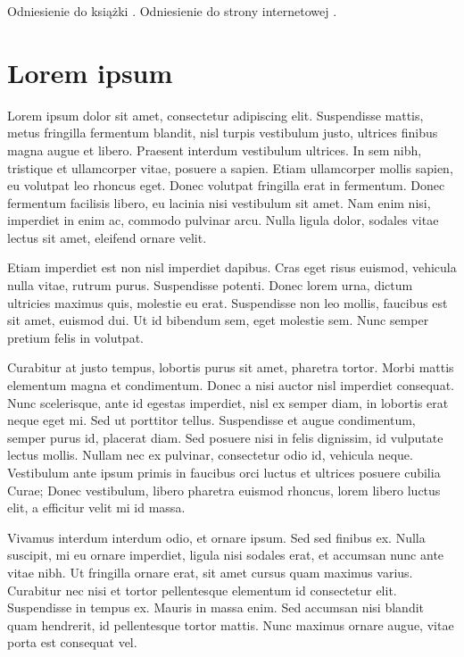 \documentclass[a4paper,12pt,polish,twoside]{extreport}
\begin{document}
Odniesienie do książki \cite{example_book}. Odniesienie do strony internetowej \cite{example_website}.

\section{Lorem ipsum}
Lorem ipsum dolor sit amet, consectetur adipiscing elit. Suspendisse mattis, metus fringilla fermentum blandit, nisl turpis vestibulum justo, ultrices finibus magna augue et libero. Praesent interdum vestibulum ultrices. In sem nibh, tristique et ullamcorper vitae, posuere a sapien. Etiam ullamcorper mollis sapien, eu volutpat leo rhoncus eget. Donec volutpat fringilla erat in fermentum. Donec fermentum facilisis libero, eu lacinia nisi vestibulum sit amet. Nam enim nisi, imperdiet in enim ac, commodo pulvinar arcu. Nulla ligula dolor, sodales vitae lectus sit amet, eleifend ornare velit.

Etiam imperdiet est non nisl imperdiet dapibus. Cras eget risus euismod, vehicula nulla vitae, rutrum purus. Suspendisse potenti. Donec lorem urna, dictum ultricies maximus quis, molestie eu erat. Suspendisse non leo mollis, faucibus est sit amet, euismod dui. Ut id bibendum sem, eget molestie sem. Nunc semper pretium felis in volutpat.

Curabitur at justo tempus, lobortis purus sit amet, pharetra tortor. Morbi mattis elementum magna et condimentum. Donec a nisi auctor nisl imperdiet consequat. Nunc scelerisque, ante id egestas imperdiet, nisl ex semper diam, in lobortis erat neque eget mi. Sed ut porttitor tellus. Suspendisse et augue condimentum, semper purus id, placerat diam. Sed posuere nisi in felis dignissim, id vulputate lectus mollis. Nullam nec ex pulvinar, consectetur odio id, vehicula neque. Vestibulum ante ipsum primis in faucibus orci luctus et ultrices posuere cubilia Curae; Donec vestibulum, libero pharetra euismod rhoncus, lorem libero luctus elit, a efficitur velit mi id massa.

Vivamus interdum interdum odio, et ornare ipsum. Sed sed finibus ex. Nulla suscipit, mi eu ornare imperdiet, ligula nisi sodales erat, et accumsan nunc ante vitae nibh. Ut fringilla ornare erat, sit amet cursus quam maximus varius. Curabitur nec nisi et tortor pellentesque elementum id consectetur elit. Suspendisse in tempus ex. Mauris in massa enim. Sed accumsan nisi blandit quam hendrerit, id pellentesque tortor mattis. Nunc maximus ornare augue, vitae porta est consequat vel.
\end{document}
